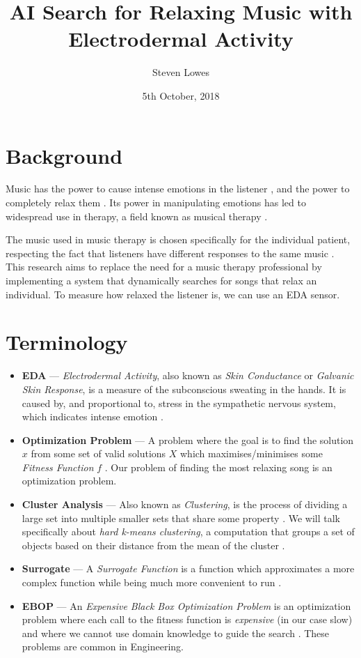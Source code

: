 \documentclass{article}
\title{AI Search for Relaxing Music with Electrodermal Activity}
\author{Steven Lowes}
\date{5th October, 2018}
\begin{document}
	\maketitle
	
	\section{Background}
	Music has the power to cause intense emotions in the listener \cite{agostino_how_2008}, and the power to completely relax them \cite{elliott_relaxing_2011}. Its power in manipulating emotions has led to widespread use in therapy, a field known as musical therapy \cite{american_music_therapy_association_definition_nodate}.
	
	The music used in music therapy is chosen specifically for the individual patient, respecting the fact that listeners have different responses to the same music \cite{american_music_therapy_association_definition_nodate}. This research aims to replace the need for a music therapy professional by implementing a system that dynamically searches for songs that relax an individual. To measure how relaxed the listener is, we can use an EDA sensor.
	
	\section{Terminology}
	\begin{itemize}
		\item \textbf{EDA} --- \emph{Electrodermal Activity}, also known as \emph{Skin Conductance} or \emph{Galvanic Skin Response}, is a measure of the subconscious sweating in the hands. It is caused by, and proportional to, stress in the sympathetic nervous system, which indicates intense emotion \cite{farnsworth_what_2018, boucsein_electrodermal_2012}.
		\item \textbf{Optimization Problem} --- A problem where the goal is to find the solution $x$ from some set of valid solutions $X$ which maximises/minimises some \emph{Fitness Function} $f$ \cite{boyd_convex_2004}. Our problem of finding the most relaxing song is an optimization problem.
		\item \textbf{Cluster Analysis} --- Also known as \emph{Clustering}, is the process of dividing a large set into multiple smaller sets that share some property \cite{estivill-castro_why_2002}. We will talk specifically about \emph{hard k-means clustering}, a computation that groups a set of objects based on their distance from the mean of the cluster \cite{kanungo_efficient_2002}.
		\item \textbf{Surrogate} --- A \emph{Surrogate Function} is a function which approximates a more complex function while being much more convenient to run \cite{mairal_optimization_2013}.
		\item \textbf{EBOP} --- An \emph{Expensive Black Box Optimization Problem} is an optimization problem where each call to the fitness function is \emph{expensive} (in our case slow) and where we cannot use domain knowledge to guide the search \cite{jones_efficient_1998}. These problems are common in Engineering.
	\end{itemize}
	
\end{document}
